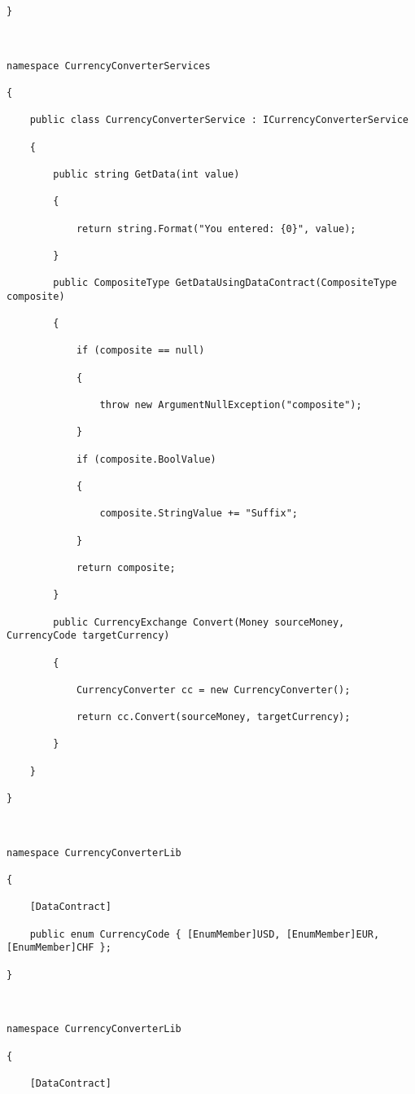 \documentclass[a4paper,10pt]{scrreprt}
\begin{document}
\begin{lstlisting}[caption=wcf example]
}



namespace CurrencyConverterServices

{

    public class CurrencyConverterService : ICurrencyConverterService

    {

        public string GetData(int value)

        {

            return string.Format("You entered: {0}", value);

        }

        public CompositeType GetDataUsingDataContract(CompositeType composite)

        {

            if (composite == null)

            {

                throw new ArgumentNullException("composite");

            }

            if (composite.BoolValue)

            {

                composite.StringValue += "Suffix";

            }

            return composite;

        }

        public CurrencyExchange Convert(Money sourceMoney, CurrencyCode targetCurrency)

        {

            CurrencyConverter cc = new CurrencyConverter();

            return cc.Convert(sourceMoney, targetCurrency);

        }

    }

}



namespace CurrencyConverterLib

{

    [DataContract]

    public enum CurrencyCode { [EnumMember]USD, [EnumMember]EUR, [EnumMember]CHF };

}



namespace CurrencyConverterLib

{

    [DataContract]


\end{lstlisting}
\end{document}
